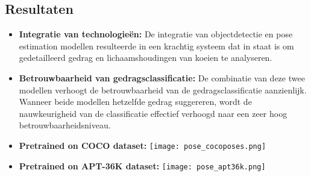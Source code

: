 \subsection{Resultaten}
\begin{itemize}
  \item \textbf{Integratie van technologieën:} De integratie van objectdetectie en pose estimation modellen resulteerde in een krachtig systeem dat in staat is om gedetailleerd gedrag en lichaamshoudingen van koeien te analyseren.
  \item \textbf{Betrouwbaarheid van gedragsclassificatie: } De combinatie van deze twee modellen verhoogt de betrouwbaarheid van de gedragsclassificatie aanzienlijk. Wanneer beide modellen hetzelfde gedrag suggereren, wordt de nauwkeurigheid van de classificatie effectief verhoogd naar een zeer hoog betrouwbaarheidsniveau.
  \item \textbf{Pretrained on COCO dataset:} \newline \texttt{[image: pose\_cocoposes.png]}
  \item \textbf{Pretrained on APT-36K dataset:} \newline \texttt{[image: pose\_apt36k.png]}
\end{itemize}